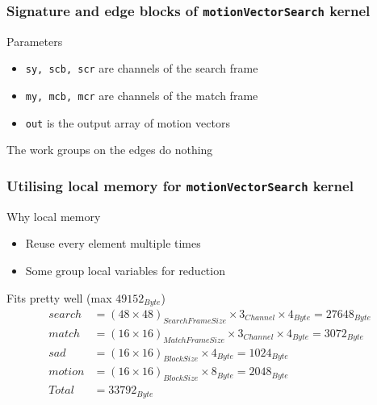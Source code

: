 \begin{frame}
  \frametitle{Signature and edge blocks of
    \lstinline{motionVectorSearch} kernel}
  \begin{block}{Parameters}
    \begin{itemize}
    \item \lstinline{sy, scb, scr} are channels of the search frame
    \item \lstinline{my, mcb, mcr} are channels of the match frame
    \item \lstinline{out} is the output array of motion vectors
    \end{itemize}
  \end{block}
  \begin{exampleblock}{}
    
  \end{exampleblock}
  \begin{alertblock}{}
    The work groups on the edges do nothing
  \end{alertblock}
\end{frame}

\begin{frame}
  \frametitle{Utilising local memory for
    \lstinline{motionVectorSearch} kernel}
  \begin{block}{Why local memory}
    \begin{itemize}
    \item<+-> Reuse every element multiple times
    \item<+-> Some group local variables for reduction
    \end{itemize}
  \end{block}
  \onslide <+->
  \begin{exampleblock}{}
    
  \end{exampleblock}
  \onslide <+->
  Fits pretty well (max \(49152_{Byte}\))
  \begin{align*}
    search &= (48 \times 48)_{SearchFrameSize} \times 3_{Channel} \times
             4_{Byte} = 27648_{Byte}\\
    match &= (16 \times 16)_{MatchFrameSize} \times 3_{Channel} \times
            4_{Byte} = 3072_{Byte} \\
    sad &= (16 \times 16)_{BlockSize} \times 4_{Byte} = 1024_{Byte} \\
    motion &= (16 \times 16)_{BlockSize} \times 8_{Byte} = 2048_{Byte} \\
    Total &= 33792_{Byte}
  \end{align*}
\end{frame}


